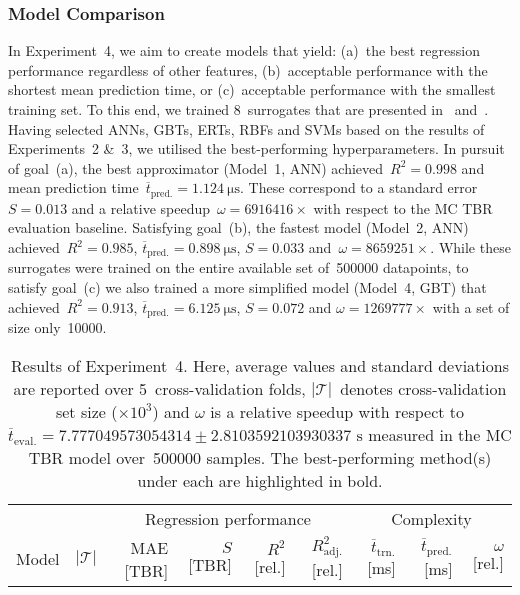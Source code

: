 \subsubsection{Model Comparison}
\label{sec:res-exp4}

In Experiment~4, we aim to create models that yield:
(a)~the best regression performance regardless
of other features, (b)~acceptable performance with the shortest mean
prediction time, or (c)~acceptable performance with the smallest training set.
To this end, we trained 8~surrogates that are presented in~
and~.
Having selected ANNs, GBTs, ERTs, RBFs and SVMs based on the results of
Experiments~2 \&~3, we utilised the best-performing hyperparameters.
In pursuit of goal~(a), the best approximator (Model~1,
ANN) achieved~$R^2=\num{0.998}$ and mean prediction
time~$\overline{t}_{\text{pred.}}=\SI{1.124}{\micro\second}$. These correspond
to a standard error~$S=\num{0.013}$ and a relative speedup~$\omega=\num{6916416} \times$
with respect to the MC TBR evaluation baseline. Satisfying
goal~(b), the fastest model (Model~2, ANN) achieved~$R^2=\num{0.985}$,
$\overline{t}_{\text{pred.}}=\SI{0.898}{\micro\second}$, $S=\num{0.033}$
and~$\omega=\num{8659251} \times$.
While these surrogates
were trained on the entire available set of~\num{500000} datapoints, to satisfy
goal~(c) we also trained a more simplified model (Model~4, GBT)
that achieved~$R^2=\num{0.913}$,
$\overline{t}_{\text{pred.}}=\SI{6.125}{\micro\second}$, $S=\num{0.072}$ and $\omega=\num{1269777} \times$
with a set of size only~\num{10000}.

\begin{table*}
	\centering
	\caption{\label{tbl:exp4-detailed-results}Results of Experiment~4. Here,
		average values and standard deviations are reported over 5~cross-validation folds,
		$|\mathcal{T}|$~denotes cross-validation set size ($\times 10^3$)
		and $\omega$ is a relative speedup with respect to
		$\overline{t}_{\text{eval.}}=\num{7.777049573054314} \pm
		\num{2.8103592103930337} \text{ s}$
		measured in the MC TBR model over~\num{500000} samples.
	The best-performing method(s) under each are highlighted in bold.}
	\setlength\tabcolsep{4pt}
	\begin{indented}
	\item[]
		\scriptsize
		\begin{tabular}{lrrrrrrrr}
		\toprule
		{} & {} & \multicolumn{4}{c}{Regression performance} &
		\multicolumn{3}{c}{Complexity}\\
		\cmidrule(lr){3-6}
		\cmidrule(lr){7-9}
		Model & $|\mathcal{T}|$ & MAE [TBR] & $S$ [TBR] & $R^2$ [rel.] & $R^2_{\text{adj.}}$ [rel.]
						& $\overline{t}_{\text{trn.}}$ [\si{\milli\second}] &
		$\overline{t}_{\text{pred.}}$ [\si{\milli\second}] & $\omega$ [rel.]\\
		\midrule
		
		\bottomrule
		\end{tabular}
	\end{indented}
\end{table*}

